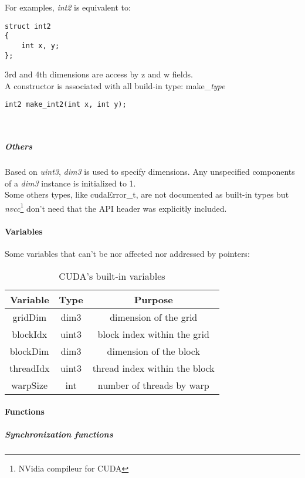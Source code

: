 For examples, \emph{int2} is equivalent to:
\begin{verbatim}struct int2
{
	int x, y;
};\end{verbatim}
3rd and 4th dimensions are access by z and w fields.\\

A constructor is associated with all build-in type: make\_\emph{type}
\begin{verbatim}int2 make_int2(int x, int y);\end{verbatim}\\
			
					\subparagraph{Others}

Based on \emph{uint3}, \emph{dim3} is used to specify dimensions. Any unspecified components of a \emph{dim3} instance is initialized to 1.\\

Some others types, like cudaError\_t, are not documented as built-in types but \emph{nvcc}\footnote{NVidia compileur for CUDA} don't need that the 
API header was explicitly included.

				\paragraph{Variables}

Some variables that can't be nor affected nor addressed by pointers:
\begin{table}[!h]
	\caption{CUDA's built-in variables}
	\center
	\begin{tabular}{|c|c|c|} \hline
	Variable & Type & Purpose \\\hline\hline
	gridDim   & dim3  & dimension of the grid \\\hline
	blockIdx  & uint3 & block index within the grid \\\hline
	blockDim  & dim3  & dimension of the block \\\hline
	threadIdx & uint3 & thread index within the block \\\hline
	warpSize  & int   & number of threads by warp \\\hline
	\end{tabular}
	\label{heterogeneous:tabCudaVariable}
\end{table}

				\paragraph{Functions}

					\subparagraph{Synchronization functions}
					
